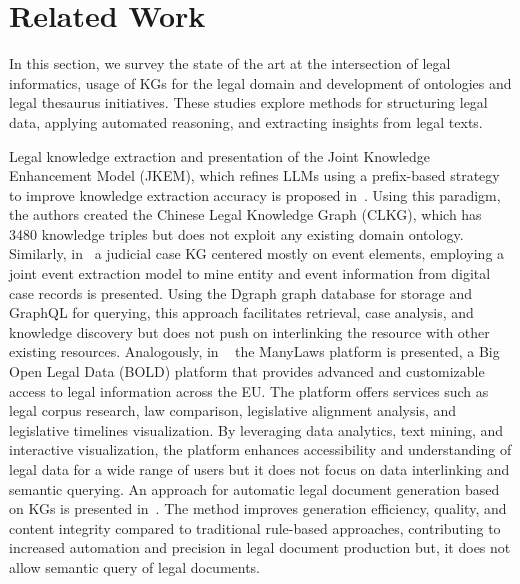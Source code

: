\documentclass[runningheads]{llncs}
\begin{document}
\section{Related Work}\label{related}
In this section, we survey the state of the art %
at the intersection of legal informatics, %
usage of KGs for the legal domain and development of ontologies and legal thesaurus initiatives. %
These studies explore methods for structuring legal data, applying automated reasoning, and extracting insights from legal texts. %

Legal knowledge extraction and presentation of %
the Joint Knowledge Enhancement Model (JKEM), which refines LLMs using a %
prefix-based strategy to improve knowledge extraction accuracy is proposed in~\cite{li2024construction}. %
Using this paradigm, the authors created the Chinese Legal Knowledge Graph (CLKG), which has 3480 knowledge triples but does not exploit any existing domain ontology. %
Similarly, %
in~\cite{zhao2024method} a judicial case KG centered mostly on event elements, employing a joint event extraction model to mine entity and event information from digital case records is presented. Using the Dgraph graph database for storage and GraphQL for querying, this approach facilitates %
retrieval, case analysis, and knowledge discovery but does not push on interlinking the resource with other existing resources. %
Analogously, %
in ~\cite{stavropoulou2020architecting} %
the ManyLaws platform is presented, %
a Big Open Legal Data (BOLD) platform that provides advanced and customizable access to legal information across the EU. The platform offers services such as legal corpus research, law comparison, legislative alignment analysis, and legislative timelines visualization. By leveraging data analytics, text mining, %
and interactive visualization, the platform enhances accessibility and understanding of legal data for a wide range of users but it does not focus on data interlinking and semantic querying. %
An approach for automatic legal document generation based on KGs is presented in~\cite{wei2024intelligent}. The method improves generation efficiency, quality, and content integrity %
compared to traditional rule-based approaches, contributing to %
increased automation and precision in legal document production but, it does not allow %
semantic query of legal documents. 
\end{document}
